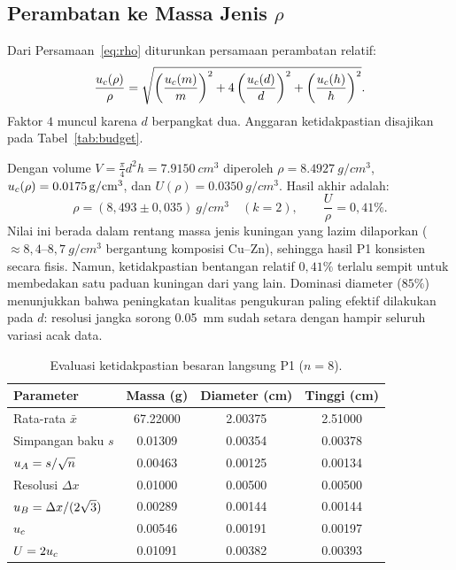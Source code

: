 \documentclass[a4paper, 12pt]{article}
\begin{document}
        \subsection{Perambatan ke Massa Jenis \texorpdfstring{$\rho$}{rho}}
        Dari Persamaan~\eqref{eq:rho} diturunkan persamaan perambatan relatif:
        \begin{equation}
            \frac{u_{c}(\rho)}{\rho}=\sqrt{\left(\frac{u_{c}(m)}{m}\right)^{2}+4\left(\frac{u_{c}(d)}{d}\right)^{2}+\left(\frac{u_{c}(h)}{h}\right)^{2}}.
            \label{eq:urho}
        \end{equation}
        Faktor $4$ muncul karena $d$ berpangkat dua. Anggaran ketidakpastian disajikan pada Tabel~\ref{tab:budget}.

        Dengan volume $V=\tfrac{\pi}{4}d^2h=\SI{7,9150}{cm^3}$ diperoleh $\rho=\SI{8,4927}{g/cm^3}$, $u_{c}(\rho)=\SI{0,0175}{g/cm^3}$, dan $U(\rho)=\SI{0,0350}{g/cm^3}$. Hasil akhir adalah:
        \begin{equation}
            \boxed{\rho=(8{,}493\pm0{,}035)\ \si{g/cm^3}\quad(k=2),\qquad \frac{U}{\rho}=0{,}41\%.}
        \end{equation}
        Nilai ini berada dalam rentang massa jenis kuningan yang lazim dilaporkan ($\approx 8{,}4$--$8{,}7\ \si{g/cm^3}$ bergantung komposisi Cu--Zn), sehingga hasil P1 konsisten secara fisis. Namun, ketidakpastian bentangan relatif $0{,}41\%$ terlalu sempit untuk membedakan satu paduan kuningan dari yang lain. Dominasi diameter ($85\%$) menunjukkan bahwa peningkatan kualitas pengukuran paling efektif dilakukan pada $d$: resolusi jangka sorong \SI{0,05}{mm} sudah setara dengan hampir seluruh variasi acak data.

\begin{table}[H]
\centering
\singlespacing
\caption{Evaluasi ketidakpastian besaran langsung P1 ($n=8$).}
\label{tab:uP1}
\small
\begin{tabular}{l S[table-format=2.5] S[table-format=1.5] S[table-format=1.5]}
\toprule
\textbf{Parameter} & {Massa (g)} & {Diameter (cm)} & {Tinggi (cm)}\\
\midrule
Rata-rata $\bar{x}$ & 67.22000 & 2.00375 & 2.51000\\
Simpangan baku $s$ & 0.01309 & 0.00354 & 0.00378\\
$u_{A}=s/\sqrt{n}$ & 0.00463 & 0.00125 & 0.00134\\
Resolusi $\Delta x$ & 0.01000 & 0.00500 & 0.00500\\
$u_{B}=\Delta x/(2\sqrt{3})$ & 0.00289 & 0.00144 & 0.00144\\
$u_{c}$ & 0.00546 & 0.00191 & 0.00197\\
$U=2u_{c}$ & 0.01091 & 0.00382 & 0.00393\\
\bottomrule
\end{tabular}
\end{table}
\end{document}
